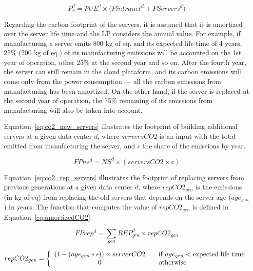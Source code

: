 \begin{equation} \label{eq:power_cons_gen}
   P^d_k  = PUE^d \times \big(  Pintranet^d + PServers^d\big)
\end{equation}


Regarding the carbon footprint of the servers, it is assumed that it is amortized over the server life time and the LP considers the annual value. For example, if manufacturing a server emits 800 kg of  eq. and its expected life time of 4 years, 25\% (200 kg of  eq.) of its manufacturing emissions will be accounted on the 1st year of operation, other 25\% at the second year and so on. After the fourth year, the server can still remain in the cloud plataform, and its carbon emissions will come only from the power consumption --- all the carbon emissions from manufacturing has been amortized.  On the other hand, if the server is replaced at the second year of operation, the 75\% remaining of its emissions from manufacturing will also be taken into account.

Equation~\eqref{eq:co2_new_servers} illustrates the footprint of building additional servers at a given data center $d$, where $serversCO2$ is an input with the total  emitted from manufacturing the server, and $\epsilon$ the share of the emissions by year.


\begin{equation} \label{eq:co2_new_servers}
FPns^d = NS^d \times ( serversCO2 \times \epsilon)	
\end{equation}


Equation~\eqref{eq:co2_rep_servers} illustrates the footprint of replacing servers from previous generations at a given data center $d$, where $repCO2_{gen}$ is the emissions (in kg of  eq) from replacing the old servers that depends on the server age ($age_{gen}$) in years. The function that computes the value of  $repCO2_{gen}$  is defined in Equation~\eqref{eq:amortizedCO2}. 

\begin{equation} \label{eq:co2_rep_servers}
FPrep^d = \sum_{gen} REP_{gen}^d  \times repCO2_{gen}
\end{equation}


\begin{equation} \label{eq:amortizedCO2}
repCO2_{gen} =  \left\{ 
  \begin{array}{ c l }
    (1 - (age_{gen} * \epsilon)) \times serverCO2   & \quad \textrm{if $age_{gen}$}  <  \textrm{expected life time}      \\
    0     & \quad  \textrm{otherwise}   \\
  \end{array}
\right.
\end{equation}


